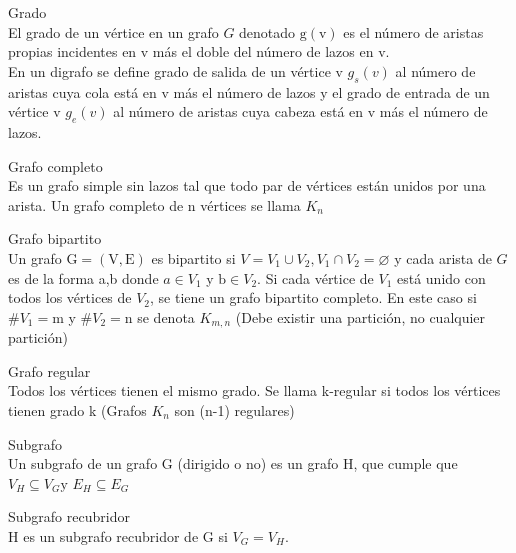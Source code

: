 \documentclass{article}
\begin{document}
\begin{defn}
Grado \\ El grado de un vértice en un grafo $G$ denotado $\mathrm{g}(\mathrm{v})$ es el número de aristas propias incidentes en v más el doble del número de lazos en v. \\ En un digrafo se define grado de salida de un vértice v $g_{s}(v)$ al número de aristas cuya cola está en v más el número de lazos y el grado de entrada de un vértice v $g_{e}(v)$ al número de aristas cuya cabeza está en $\mathrm{v}$ más el número de lazos.
\end{defn}

\begin{defn}
Grafo completo \\ Es un grafo simple sin lazos tal que todo par de vértices están unidos por una arista. Un grafo completo de n vértices se llama $K_{n}$
\end{defn}

\begin{defn}
Grafo bipartito \\ Un grafo $\mathrm{G}=(\mathrm{V}, \mathrm{E})$ es bipartito si $V=V_{1} \cup V_{2}, V_{1} \cap V_{2}=\varnothing$ y cada arista de $G$ es de la forma a,b donde $a \in V_{1}$ y $\mathrm{b} \in V_{2}$. Si cada vértice de $V_{1}$ está unido con todos los vértices de $V_{2}$, se tiene un grafo bipartito completo. En este caso si $\# V_{1}=\mathrm{m}$ y $\#V_{2}=\mathrm{n}$ se denota $K_{m, n}$ (Debe existir una partición, no cualquier partición)
\end{defn}

\begin{defn}
Grafo regular \\ Todos los vértices tienen el mismo grado. Se llama k-regular si todos los vértices tienen grado k (Grafos $K_{n}$ son (n-1) regulares)
\end{defn}

\begin{defn}
Subgrafo \\ Un subgrafo de un grafo G (dirigido o no) es un grafo $\mathrm{H}$, que cumple que $V_{H} \subseteq V_{G} \mathrm{y}$ ${E}_{H} \subseteq {E}_{G}$
\end{defn}

\begin{defn}
Subgrafo recubridor \\ $\mathrm{H}$ es un subgrafo recubridor de $\mathrm{G}$ si $V_{G}=V_{H} .$
\end{defn}
\end{document}

